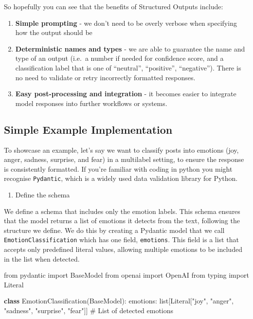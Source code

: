 \documentclass[
  letterpaper,
  DIV=11,
  numbers=noendperiod]{scrreprt}
\newenvironment{Shaded}{\begin{snugshade}}{\end{snugshade}}
\newcommand{\BuiltInTok}[1]{\textcolor[rgb]{0.00,0.23,0.31}{#1}}
\newcommand{\CommentTok}[1]{\textcolor[rgb]{0.37,0.37,0.37}{#1}}
\newcommand{\ImportTok}[1]{\textcolor[rgb]{0.00,0.46,0.62}{#1}}
\newcommand{\KeywordTok}[1]{\textcolor[rgb]{0.00,0.23,0.31}{\textbf{#1}}}
\newcommand{\NormalTok}[1]{\textcolor[rgb]{0.00,0.23,0.31}{#1}}
\newcommand{\StringTok}[1]{\textcolor[rgb]{0.13,0.47,0.30}{#1}}
\providecommand{\tightlist}{%
  \setlength{\itemsep}{0pt}\setlength{\parskip}{0pt}}\usepackage{longtable,booktabs,array}
\begin{document}
So hopefully you can see that the benefits of Structured Outputs
include:

\begin{enumerate}
\def\labelenumi{\arabic{enumi}.}
\item
  \textbf{Simple prompting} - we don't need to be overly verbose when
  specifying how the output should be
\item
  \textbf{Deterministic names and types} - we are able to guarantee the
  name and type of an output (i.e.~a number if needed for confidence
  score, and a classification label that is one of ``neutral'',
  ``positive'', ``negative''). There is no need to validate or retry
  incorrectly formatted responses.
\item
  \textbf{Easy post-processing and integration} - it becomes easier to
  integrate model responses into further workflows or systems.
\end{enumerate}

\subsection{Simple Example
Implementation}\label{simple-example-implementation}

To showcase an example, let's say we want to classify posts into
emotions (joy, anger, sadness, surprise, and fear) in a multilabel
setting, to ensure the response is consistently formatted. If you're
familiar with coding in python you might recognise \texttt{Pydantic},
which is a widely used data validation library for Python.

\begin{enumerate}
\def\labelenumi{\arabic{enumi}.}
\tightlist
\item
  Define the schema
\end{enumerate}

We define a schema that includes only the emotion labels. This schema
ensures that the model returns a list of emotions it detects from the
text, following the structure we define. We do this by creating a
Pydantic model that we call \texttt{EmotionClassification} which has one
field, \texttt{emotions}. This field is a list that accepts only
predefined literal values, allowing multiple emotions to be included in
the list when detected.

\begin{Shaded}
\begin{Highlighting}[]
\ImportTok{from}\NormalTok{ pydantic }\ImportTok{import}\NormalTok{ BaseModel}
\ImportTok{from}\NormalTok{ openai }\ImportTok{import}\NormalTok{ OpenAI}
\ImportTok{from}\NormalTok{ typing }\ImportTok{import}\NormalTok{ Literal}

\KeywordTok{class}\NormalTok{ EmotionClassification(BaseModel):}
\NormalTok{    emotions: }\BuiltInTok{list}\NormalTok{[Literal[}\StringTok{"joy"}\NormalTok{, }\StringTok{"anger"}\NormalTok{, }\StringTok{"sadness"}\NormalTok{, }\StringTok{"surprise"}\NormalTok{, }\StringTok{"fear"}\NormalTok{]]  }\CommentTok{\# List of detected emotions}
\end{Highlighting}
\end{Shaded}
\end{document}
